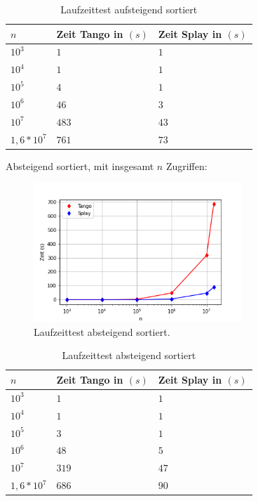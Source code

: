 \documentclass[a4paper,12pt]{article}
\begin{document}
\begin{table}[H]
	\begin{center}
		\begin{tabular}[c]{|l|l|l|}
			\hline
			$n$ & Zeit Tango in $\left(s\right)$ &Zeit Splay in $\left(s\right)$ \\
			\hline
			$10^3$ & $1$ &$1$ \\
			\hline
			$10^4$  & $1$ &$1$  \\
			\hline
			$10^5$  & $4$ &$1$  \\
			\hline
			$10^6$  & $46$ &$3$  \\
			\hline
			$10^7$  & $483$ &$43$  \\
			\hline
			$1,6 *10^7$  & $761$ &$73$  \\
			\hline
		\end{tabular}
		\caption{Laufzeittest aufsteigend sortiert} 
	\end{center}
\end{table}
Absteigend sortiert, mit insgesamt $n$ Zugriffen:
\begin{figure}[H]
	\centering
	\includegraphics[width=0.7\textwidth]{"Medien/laufzeittest/diagramm/sorted2"}
	\caption{Laufzeittest absteigend sortiert.}
\end{figure}
\begin{table}[H]
	\begin{center}
		\begin{tabular}[c]{|l|l|l|}
			\hline
			$n$ & Zeit Tango in $\left(s\right)$ &Zeit Splay in $\left(s\right)$ \\
			\hline
			$10^3$ & $1$ &$1$ \\
			\hline
			$10^4$  & $1$ &$1$  \\
			\hline
			$10^5$  & $3$ &$1$  \\
			\hline
			$10^6$  & $48$ &$5$  \\
			\hline
			$10^7$  & $319$ &$47$  \\
			\hline
			$1,6 *10^7$  & $686$ &$90$  \\
			\hline
		\end{tabular}
		\caption{Laufzeittest absteigend sortiert} 
	\end{center}
\end{table}
\end{document}
